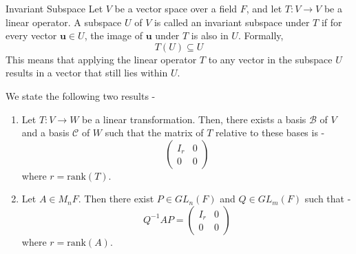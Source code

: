 \documentclass[openany]{book}
\begin{document}
\begin{mydefinition}{Invariant Subspace}
    Let $V$ be a vector space over a field $F$, and let $T: V \to V$ be a linear operator. A subspace $U$ of $V$ is called an invariant subspace under $T$ if for every vector $\mathbf{u} \in U$, the image of $\mathbf{u}$ under $T$ is also in $U$. Formally,
    $$T(U) \subseteq U$$
    This means that applying the linear operator $T$ to any vector in the subspace $U$ results in a vector that still lies within $U$.
\end{mydefinition}
\begin{mytheorem}
    We state the following two results - \\
    \begin{enumerate}
        \item Let $T: V \to W$ be a linear transformation. Then, there exists a basis $\mathcal{B}$ of $V$ and a basis $\mathcal{C}$ of $W$ such that the matrix of $T$ relative to these bases is - 
        $$\left(\begin{array}{c|c}
        I_r & 0 \\
        \hline
        0 & 0
        \end{array} \right)$$ where $r = \text{rank}(T)$.
        \item Let $A \in M_n{F}$. Then there exist $P \in GL_n(F)$ and $Q \in GL_m(F)$ such that - 
        $$Q^{-1}AP = \left(\begin{array}{c|c}
        I_r & 0 \\
        \hline
        0 & 0
        \end{array} \right)$$ where $r = \text{rank}(A)$.
    \end{enumerate}
\end{mytheorem}
\end{document}
